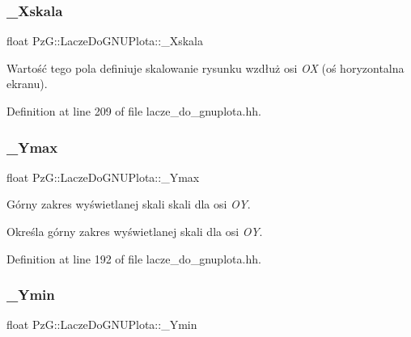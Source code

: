 \subsubsection{\texorpdfstring{\+\_\+\+Xskala}{\_Xskala}}
{\footnotesize\ttfamily float Pz\+G\+::\+Lacze\+Do\+G\+N\+U\+Plota\+::\+\_\+\+Xskala\hspace{0.3cm}{\ttfamily [protected]}}

Wartość tego pola definiuje skalowanie rysunku wzdłuż osi {\itshape OX} (oś horyzontalna ekranu). 

Definition at line 209 of file lacze\+\_\+do\+\_\+gnuplota.\+hh.

\mbox{\label{class_pz_g_1_1_lacze_do_g_n_u_plota_ad7dfd3fad82ea0720ec89eacc18410bf}} 
\subsubsection{\texorpdfstring{\+\_\+\+Ymax}{\_Ymax}}
{\footnotesize\ttfamily float Pz\+G\+::\+Lacze\+Do\+G\+N\+U\+Plota\+::\+\_\+\+Ymax\hspace{0.3cm}{\ttfamily [protected]}}



Górny zakres wyświetlanej skali skali dla osi {\itshape OY}. 

Określa górny zakres wyświetlanej skali dla osi {\itshape OY}. 

Definition at line 192 of file lacze\+\_\+do\+\_\+gnuplota.\+hh.

\mbox{\label{class_pz_g_1_1_lacze_do_g_n_u_plota_abc555fd6b82b0d5c9efb4802b58dc317}} 
\subsubsection{\texorpdfstring{\+\_\+\+Ymin}{\_Ymin}}
{\footnotesize\ttfamily float Pz\+G\+::\+Lacze\+Do\+G\+N\+U\+Plota\+::\+\_\+\+Ymin\hspace{0.3cm}{\ttfamily [protected]}}



